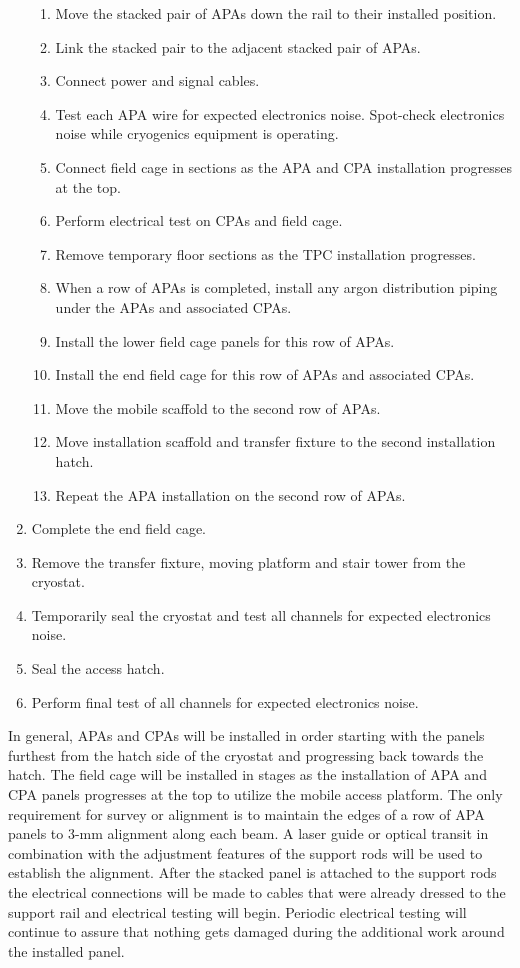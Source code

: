 \begin{enumerate}
\begin{enumerate}
\item Move the stacked pair of APAs down the rail to their installed position.  
\item Link the stacked pair to the adjacent stacked pair of APAs.
\item Connect power and signal cables. 
\item Test each APA wire for expected electronics noise. Spot-check electronics noise while cryogenics equipment is operating. 
\item Connect field cage in sections as the APA and CPA installation progresses at the top. 
\item Perform electrical test on CPAs and field cage. 
\item Remove temporary floor sections as the TPC installation progresses. 
\item When a row of APAs is completed, install any argon distribution piping under the APAs and associated CPAs.
\item Install the lower field cage panels for this row of APAs.
\item Install the end field cage for this row of APAs and associated CPAs.
\item Move the mobile scaffold to the second row of APAs.
\item Move installation scaffold and transfer fixture to the second installation hatch. 
\item Repeat the APA installation on the second row of APAs.
\end{enumerate}
\item Complete the end field cage.
\item Remove the transfer fixture, moving platform and stair tower from the cryostat. 
\item Temporarily seal the cryostat and test all channels for expected electronics noise. 
\item Seal the access hatch. 
\item Perform final test of all channels for expected electronics noise.
 \end{enumerate}
 
In general, APAs and CPAs will be installed in order starting with the panels furthest from the hatch side of the cryostat and progressing back towards the hatch. The field cage will be installed in stages as the installation 
of APA and CPA panels progresses at the top to utilize the mobile access platform. The only requirement for survey or alignment is to maintain the edges of a row of APA panels to 3-mm alignment along each beam. A laser guide or optical transit in combination with the 
adjustment features of the support rods will be used to establish the alignment. After the stacked panel is attached to the support rods the electrical connections will be made to cables that were already dressed to the support rail 
and electrical testing will begin. Periodic electrical testing will continue to assure that nothing gets damaged during the additional work around the installed panel. 

